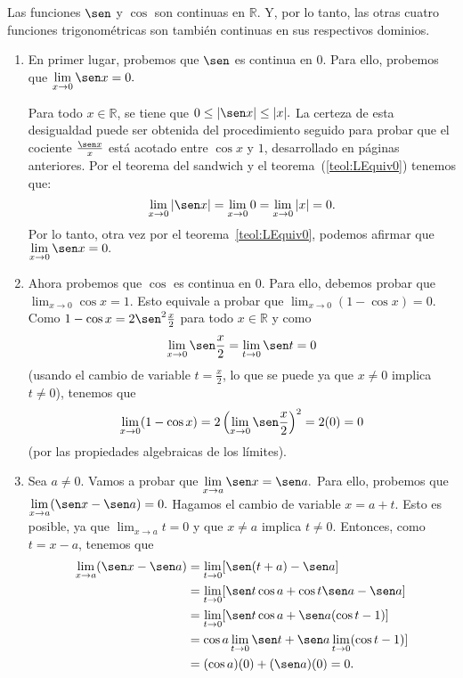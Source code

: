 \begin{exemplo}[Solución]{
Las funciones $\sen$ y $\cos$ son continuas en $\mathbb{R}$. Y, por lo tanto, las otras cuatro
funciones trigonométricas son también continuas en sus respectivos dominios. }

\begin{enumerate}[leftmargin=*]
\item En primer lugar, probemos que $\sen$ es continua en 0. Para ello, probemos que
$\displaystyle
\lim_{x\to 0}\sen x=0.
$

Para todo $x\in \mathbb{R}$, se tiene que
$
0 \leq |\sen x| \leq |x|.
$
La certeza de esta desigualdad puede ser obtenida del procedimiento seguido para probar que el
cociente $\frac{\sen x}{x}$ está acotado entre $\cos x$ y $1$, desarrollado en páginas
anteriores.
Por el teorema del sandwich y el teorema~(\ref{teol:LEquiv0}) tenemos que:
\[
\lim_{x\to 0}|\sen x| = \limjc{0}{x}{0} = \limjc{|x|}{x}{0} = 0.
\]
Por lo tanto, otra vez por el teorema~\ref{teol:LEquiv0}, podemos afirmar que
$\displaystyle
\lim_{x\to 0}\sen x=0.
$

\item Ahora probemos que $\cos$ es continua en 0. Para ello, debemos probar que
$\displaystyle
\lim_{x\to 0}\cos x=1.
$
Esto equivale a probar que
$\displaystyle
\lim_{x\to 0}(1-\cos x) = 0.
$
Como $1-\cos x= 2 \sen^2\frac{x}{2}$ para todo $x\in \mathbb{R}$ y como
\[
\lim_{x\to 0}\sen\frac{x}{2}= \lim_{t\to 0}\sen t =0
\]
(usando el cambio de variable $t=\frac{x}{2}$, lo que se puede ya que $x\neq 0$ implica  $t\neq
0$), tenemos que
\[
\lim_{x\to 0}(1-\cos x)= 2 \left(\lim_{x\to 0} \sen \frac{x}{2}  \right)^2 =2(0)=0
\]
(por las propiedades algebraicas de los límites).

\item Sea $a\neq 0$. Vamos a probar que
$\displaystyle
\lim_{x\to a}\sen x=\sen a.
$
Para ello, probemos que
$\displaystyle
\lim_{x\to a}(\sen x- \sen a)=0.
$
Hagamos el cambio de variable $x=a+t$. Esto es posible, ya que $\displaystyle\lim_{x\to a}t=0$ y que $x\neq
a$ implica $t\neq 0$. Entonces, como $t=x-a$, tenemos que
\begin{align*}
\lim_{x\to a}(\sen x- \sen a) & = \lim_{t\to 0}[\sen (t+a)- \sen a] \\
& = \lim_{t\to 0}[\sen t \cos a +\cos t \sen a- \sen a]  \\
& = \lim_{t\to 0}[\sen t \cos a +\sen a(\cos t -1) ]  \\
& = \cos a \lim_{t\to 0}\sen t  +\sen a \lim_{t\to 0}(\cos t -1) ] \\
&= (\cos a)(0)+ (\sen a)(0) = 0.
\end{align*}


\end{enumerate}
\end{exemplo}
